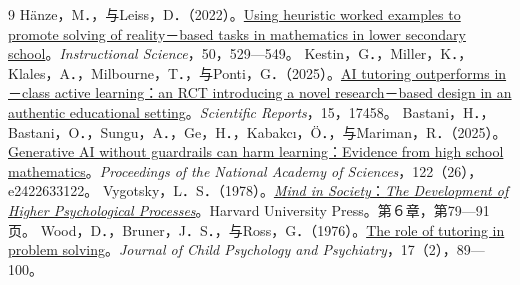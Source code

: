 \documentclass[UTF8,a4paper,11pt,fontset=windows]{ctexart}
\begin{document}
\newpage
\begingroup
\fontsize{10pt}{15pt}\selectfont
\begin{thebibliography}{9}
\setlength{\itemsep}{8pt}
\setlength{\parsep}{0pt}
\setlength{\parskip}{0pt}
Hänze，M．，与Leiss，D．（2022）。\href{https://doi.org/10.1007/s11251-022-09583-8}{Using heuristic worked examples to promote solving of reality－based tasks in mathematics in lower secondary school}。\textit{Instructional Science}，50，529—549。
Kestin，G．，Miller，K．，Klales，A．，Milbourne，T．，与Ponti，G．（2025）。\href{https://doi.org/10.1038/s41598-025-97652-6}{AI tutoring outperforms in－class active learning：an RCT introducing a novel research－based design in an authentic educational setting}。\textit{Scientific Reports}，15，17458。
Bastani，H．，Bastani，O．，Sungu，A．，Ge，H．，Kabakcı，Ö．，与Mariman，R．（2025）。\href{https://doi.org/10.1073/pnas.2422633122}{Generative AI without guardrails can harm learning：Evidence from high school mathematics}。\textit{Proceedings of the National Academy of Sciences}，122（26），e2422633122。
Vygotsky，L．S．（1978）。\href{https://www.hup.harvard.edu/books/9780674576292}{\textit{Mind in Society}：\textit{The Development of Higher Psychological Processes}}。Harvard University Press。第６章，第79—91页。
Wood，D．，Bruner，J．S．，与Ross，G．（1976）。\href{https://doi.org/10.1111/j.1469-7610.1976.tb00381.x}{The role of tutoring in problem solving}。\textit{Journal of Child Psychology and Psychiatry}，17（2），89—100。
\end{thebibliography}
\endgroup
\end{document}
